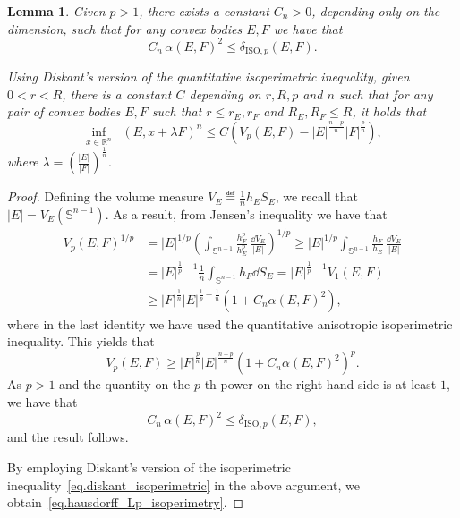 \documentclass[a4paper, 10pt, twoside]{amsart}
\numberwithin{equation}{section}
\newcommand{\lemmname}{Lemma}
\theoremstyle{plain}
\newtheorem{lemma}[theorem]{\lemmname}
\theoremstyle{definition}
\DeclareMathOperator{\dH}{\mathrm{d}_\mathrm{H}}
\begin{document}
\begin{lemma}\label{lemma.quantitative_Lp_isoperimetric}
    Given $p > 1$, there exists a constant $C_n > 0$, depending only on the dimension, such that for any convex bodies $E,F$ we have that
    \begin{equation}\label{eq.fraenkel_Lp_isoperimetry}
        C_n\, \alpha(E,F)^2 \le \delta_{\textrm{ISO},p}(E,F).
    \end{equation}

    Using Diskant's version of the quantitative isoperimetric inequality, given $0 <r <R$, there is a constant $C$ depending on $r,R,p$ and $n$ such that for any pair of convex bodies $E,F$ such that $r\le r_E, r_F$ and $R_E,R_F \le R$, it holds that 
    \begin{equation}\label{eq.hausdorff_Lp_isoperimetry}
        \inf_{x \in \mathbb{R}^n} 
        \dH(E, x + \lambda F)^n\le C \left(V_p(E,F) - |E|^{\frac{n-p}{n}}|F|^{\frac{p}{n}}\right), 
    \end{equation}
    where $\lambda = \left(\frac{|E|}{|F|}\right)^{\frac{1}{n}}$.
\end{lemma}
\begin{proof}
    Defining the volume measure $V_E \eqdef \frac{1}{n} h_E S_E$, we recall that $|E| = V_E(\mathbb{S}^{n-1})$. As a result, from Jensen's inequality we have that 
    \begin{align*}
        {V_p(E,F)}^{1/p} 
        &= 
        {|E|}^{1/p}
        {\left(
            \int_{\mathbb{S}^{n-1}} 
            \frac{h^p_F}{h^p_E}\,
            \frac{\dd V_E}{|E|}
        \right)}^{1/p}
        \ge 
         {|E|}^{1/p}
        \int_{\mathbb{S}^{n-1}} 
        \frac{h_F}{h_E}\,
        \frac{\dd V_E}{|E|}\\
        &= 
        |E|^{\frac{1}{p} - 1}
        \frac{1}{n}
        \int_{\mathbb{S}^{n-1}} 
        h_F\dd S_E 
        = 
        |E|^{\frac{1}{p} - 1}
        V_1(E,F)
        \\
        & \ge 
        |F|^{\frac{1}{n}} 
        |E|^{\frac{1}{p} - \frac{1}{n}} 
        \left(
            1 + C_n\alpha(E,F)^2
        \right),
    \end{align*}
    where in the last identity we have used the quantitative anisotropic isoperimetric inequality. This yields that
    \[
        V_p(E,F)
        \ge 
        |F|^{\frac{p}{n}} 
        |E|^{\frac{n-p}{n}} 
        \left(
            1 + C_n\alpha(E,F)^2
        \right)^p.
    \]
    As $p > 1$ and the quantity on the $p$-th power on the right-hand side is at least $1$, we have that 
    \[
        C_n\, \alpha(E,F)^2 \le 
        \delta_{\text{ISO},p}(E,F),
    \]
    and the result follows.  

    By employing Diskant's version of the isoperimetric inequality~\eqref{eq.diskant_isoperimetric} in the above argument, we obtain~\eqref{eq.hausdorff_Lp_isoperimetry}. 
\end{proof}
\end{document}
